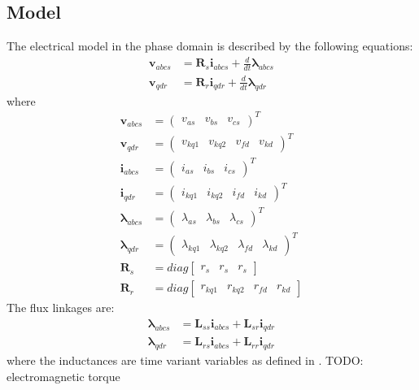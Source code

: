 \subsection{Model}
The electrical model in the phase domain is described by the following equations:
%
\begin{align}
  \mathbf{v}_{abcs} &= \mathbf{R}_s \mathbf{i}_{abcs} + \frac{d}{dt} \boldsymbol{\lambda}_{abcs} \\
  \mathbf{v}_{qdr} &= \mathbf{R}_r \mathbf{i}_{qdr} + \frac{d}{dt}  \boldsymbol{\lambda}_{qdr}
\end{align}
%
where
%
\begin{align}
  \mathbf{v}_{abcs} &= 
  \begin{pmatrix}
    v_{as} & v_{bs} & v_{cs}
  \end{pmatrix}^T \\
  \mathbf{v}_{qdr} &= 
  \begin{pmatrix}
    v_{kq1} & v_{kq2} & v_{fd} & v_{kd} 
  \end{pmatrix}^T \\
  \mathbf{i}_{abcs} &= 
  \begin{pmatrix}
    i_{as} & i_{bs} & i_{cs}
  \end{pmatrix}^T \\
  \mathbf{i}_{qdr} &= 
  \begin{pmatrix}
    i_{kq1} & i_{kq2} & i_{fd} & i_{kd} 
  \end{pmatrix}^T \\
  \boldsymbol{\lambda}_{abcs} &= 
  \begin{pmatrix}
    \lambda_{as} & \lambda_{bs} & \lambda_{cs}
  \end{pmatrix}^T \\
  \boldsymbol{\lambda}_{qdr} &= 
  \begin{pmatrix}
    \lambda_{kq1} & \lambda_{kq2} & \lambda_{fd} & \lambda_{kd} 
  \end{pmatrix}^T \\
  \mathbf{R}_s &= diag
  \begin{bmatrix}
    r_s & r_s & r_s 
  \end{bmatrix} \\
  \mathbf{R}_r &= diag
  \begin{bmatrix}
    r_{kq1} & r_{kq2} & r_{fd} & r_{kd}
  \end{bmatrix}
\end{align}
%
The flux linkages are:
%
\begin{align}
  \boldsymbol{\lambda}_{abcs} &= \mathbf{L}_{ss} \mathbf{i}_{abcs} + \mathbf{L}_{sr} \mathbf{i}_{qdr}  \\
  \boldsymbol{\lambda}_{qdr} &= \mathbf{L}_{rs} \mathbf{i}_{abcs} + \mathbf{L}_{rr} \mathbf{i}_{qdr}
\end{align}
%
where the inductances are time variant variables as defined in \cite{krause2002sudhoff}.
TODO: electromagnetic torque
\fi


